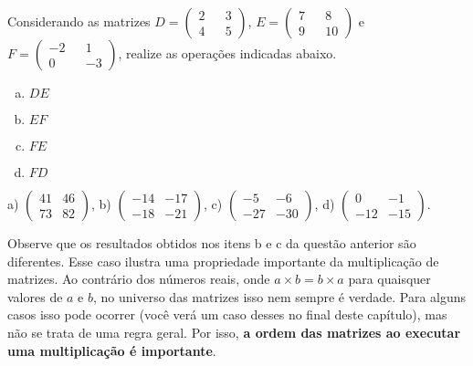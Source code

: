 \documentclass[main.tex]{subfiles}
\begin{document}
\begin{questao}
Considerando as matrizes $D=\begin{pmatrix} 2 && 3 \\ 4 && 5 \end{pmatrix}$, $E=\begin{pmatrix} 7 && 8 \\ 9 && 10 \end{pmatrix}$ e $F=\begin{pmatrix} -2 && 1 \\ 0 && -3 \end{pmatrix}$, realize as operações indicadas abaixo.
\begin{enumerate}[a)]
\item $DE$
\item $EF$
\item $FE$
\item $FD$
\end{enumerate}
\end{questao}

\begin{gabarito}
	\begin{gabaritoQuestao}
		a) $\begin{pmatrix} 41 & 46 \\ 73 & 82\end{pmatrix}$, b) $\begin{pmatrix} -14 & -17 \\ -18 & -21\end{pmatrix}$, c) $\begin{pmatrix} -5 & -6 \\ -27 & -30\end{pmatrix}$, d) $\begin{pmatrix} 0 & -1 \\ -12 & -15\end{pmatrix}$.

	\end{gabaritoQuestao}
\end{gabarito}

Observe que os resultados obtidos nos itens b e c da questão anterior são diferentes. Esse caso ilustra uma propriedade importante da multiplicação de matrizes. Ao contrário dos números reais, onde $a \times b = b \times a$ para quaisquer valores de $a$ e $b$, no universo das matrizes isso nem sempre é verdade. Para alguns casos isso pode ocorrer (você verá um caso desses no final deste capítulo), mas não se trata de uma regra geral. Por isso, \textbf{a ordem das matrizes ao executar uma multiplicação é importante}.
\end{document}
